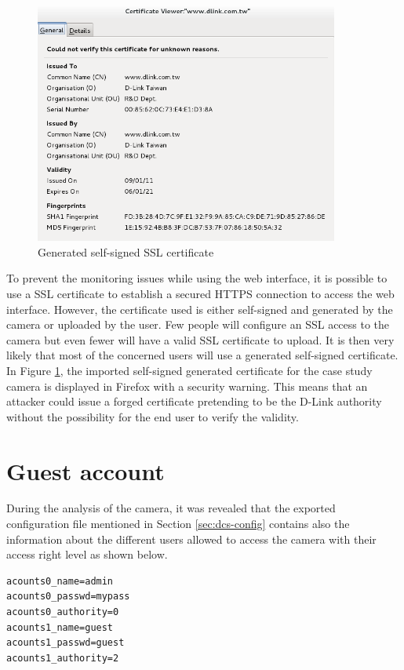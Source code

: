 \begin{figure}[h]
  \centering
  \includegraphics[width=10cm]{images/dcs-ssl.png}
  \caption{Generated self-signed SSL certificate}
  \label{fig:dcs-ssl}
\end{figure}

To prevent the monitoring issues while using the web interface, it is possible to use a SSL certificate to establish a secured HTTPS connection to access the web interface.
However, the certificate used is either self-signed and generated by the camera or uploaded by the user.
Few people will configure an SSL access to the camera but even fewer will have a valid SSL certificate to upload.
It is then very likely that most of the concerned users will use a generated self-signed certificate.\\

In Figure \ref{fig:dcs-ssl}, the imported self-signed generated certificate for the case study camera is displayed in Firefox with a security warning.
This means that an attacker could issue a forged certificate pretending to be the D-Link authority without the possibility for the end user to verify the validity.

\section{Guest account}
\label{sec:dcs-guest}

During the analysis of the camera, it was revealed that the exported configuration file mentioned in Section \ref{sec:dcs-config} contains also the information about the different users allowed to access the camera with their access right level as shown below.

{\scriptsize
\begin{verbatim}
acounts0_name=admin
acounts0_passwd=mypass
acounts0_authority=0
acounts1_name=guest
acounts1_passwd=guest
acounts1_authority=2
\end{verbatim}
}

